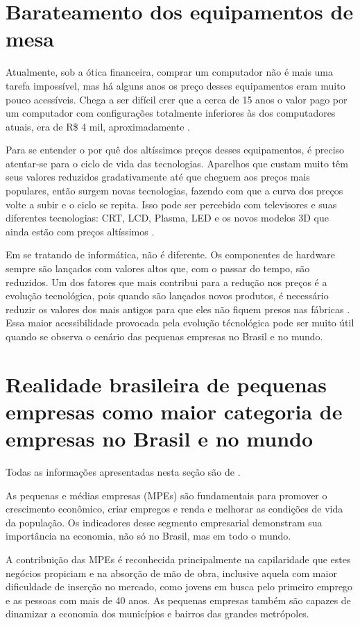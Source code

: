 \section{Barateamento dos equipamentos de mesa}

Atualmente, sob a ótica financeira, comprar um computador não é mais uma tarefa impossível, mas há alguns anos os preço desses equipamentos eram muito pouco acessíveis. Chega a ser difícil crer que a cerca de 15 anos o valor pago por um computador com configurações totalmente inferiores às dos computadores atuais, era de R\$ 4 mil, aproximadamente \cite{HAMANN}.

Para se entender o por quê dos altíssimos preços desses equipamentos, é preciso atentar-se para o ciclo de vida das tecnologias. Aparelhos que custam muito têm seus valores reduzidos gradativamente até que cheguem aos preços mais populares, então surgem novas tecnologias, fazendo com que a curva dos preços volte a subir e o ciclo se repita. Isso pode ser percebido com televisores e suas diferentes tecnologias: CRT, LCD, Plasma, LED e os novos modelos 3D que ainda estão com preços altíssimos \cite{HAMANN}.

Em se tratando de informática, não é diferente. Os componentes de hardware sempre são lançados com valores altos que, com o passar do tempo, são reduzidos. Um dos fatores que mais contribui para a redução nos preços é a evolução tecnológica, pois quando são lançados novos produtos, é necessário reduzir os valores dos mais antigos para que eles não fiquem presos nas fábricas \cite{HAMANN}. Essa maior acessibilidade provocada pela evolução técnológica pode ser muito útil quando se observa o cenário das pequenas empresas no Brasil e no mundo.

\section{Realidade brasileira de pequenas empresas como maior categoria de empresas no Brasil e no mundo}

Todas as informações apresentadas nesta seção são de .

As pequenas e médias empresas (MPEs) são fundamentais para promover o crescimento econômico, criar empregos e renda e melhorar as condições de vida da população. Os indicadores desse segmento empresarial demonstram sua importância na economia, não só no Brasil, mas em todo o mundo.

A contribuição das MPEs é reconhecida principalmente na capilaridade que estes negócios propiciam e na absorção de mão de obra, inclusive aquela com maior dificuldade de inserção no mercado, como jovens em busca pelo primeiro emprego e as pessoas com mais de 40 anos. As pequenas empresas também são capazes de dinamizar a economia dos municípios e bairros das grandes metrópoles.

